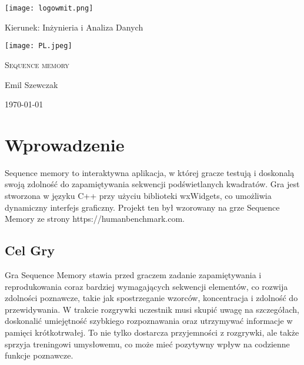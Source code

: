 \documentclass[]{report}
\begin{document}
	
\begin{titlepage}
	\centering
	\texttt{[image: logowmit.png]} %
	\vspace{2cm}
	
	Kierunek: Inżynieria i Analiza Danych %
	
	\vspace{1cm}
	\texttt{[image: PL.jpeg]} %
	
	\vspace{1cm}
	{\scshape\Large Sequence memory \par} %
	
	\vspace{1.5cm}
	{\Large Emil Szewczak \par} %
	
	\vfill
	{\large \today\par}
\end{titlepage}


\tableofcontents
	
\newpage 


	\section*{Wprowadzenie}
	
	Sequence memory to interaktywna aplikacja, w której gracze testują i doskonalą swoją zdolność do zapamiętywania sekwencji podświetlanych kwadratów. Gra jest stworzona w języku C++ przy użyciu biblioteki wxWidgets, co umożliwia dynamiczny interfejs graficzny. Projekt ten był wzorowany na grze Sequence Memory ze strony https://humanbenchmark.com.
	
	\subsection*{Cel Gry}
	
Gra Sequence Memory stawia przed graczem zadanie zapamiętywania i reprodukowania coraz bardziej wymagających sekwencji elementów, co rozwija zdolności poznawcze, takie jak spostrzeganie wzorców, koncentracja i zdolność do przewidywania. W trakcie rozgrywki uczestnik musi skupić uwagę na szczegółach, doskonalić umiejętność szybkiego rozpoznawania oraz utrzymywać informacje w pamięci krótkotrwałej. To nie tylko dostarcza przyjemności z rozgrywki, ale także sprzyja treningowi umysłowemu, co może mieć pozytywny wpływ na codzienne funkcje poznawcze.
	
\end{document}
